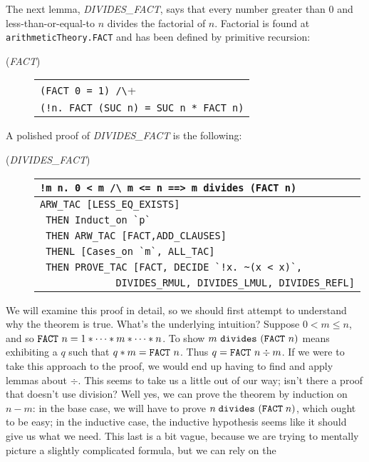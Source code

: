 The next lemma, {\small{\it DIVIDES\_FACT\/}}, says that every number
greater than $0$ and less-than-or-equal-to $n$ divides the factorial of
$n$. Factorial is found at \verb+arithmeticTheory.FACT+ and has been
defined by primitive recursion:
\begin{description}
\item [\small{({\it FACT\/})}]
\begin{tabular}[t]{l}
\verb+(FACT 0 = 1) /\+ \\
\verb+(!n. FACT (SUC n) = SUC n * FACT n)+ \\
\end{tabular}
\end{description}
A polished proof of {\small{\it DIVIDES\_FACT\/}} is the following:
\begin{description}
\item [\small{({\it DIVIDES\_FACT\/})}]
\begin{tabular}[t]{l}
\verb+!m n. 0 < m /\ m <= n ==> m divides (FACT n)+ \\ \hline
\verb+ARW_TAC [LESS_EQ_EXISTS]+ \\
\verb+ THEN Induct_on `p`+ \\
\verb+ THEN ARW_TAC [FACT,ADD_CLAUSES]+ \\
\verb+ THENL [Cases_on `m`, ALL_TAC]+ \\
\verb+ THEN PROVE_TAC [FACT, DECIDE `!x. ~(x < x)`,+ \\
\verb+             DIVIDES_RMUL, DIVIDES_LMUL, DIVIDES_REFL]+ \\
\end{tabular}
\end{description}
We will examine this proof in detail, so we should first attempt to
understand why the theorem is true. What's the underlying intuition?
Suppose $0 < m \leq n$, and so $\mbox{\tt FACT}\ n = 1 * \cdots * m *
\cdots * n$. To show $m\ \mbox{\tt divides}\ (\mbox{\tt FACT}\ n)$ means
exhibiting a $q$ such that $q * m = \mbox{\tt FACT}\ n$. Thus $q =
\mbox{\tt FACT}\ n \div m$. If we were to take this approach to the
proof, we would end up having to find and apply lemmas about
$\div$. This seems to take us a little out of our way; isn't there a
proof that doesn't use division? Well yes, we can prove the theorem by
induction on $n - m$: in the base case, we will have to prove $n\;
\mbox{\tt divides}\ (\mbox{\tt FACT}\; n)$, which ought to be easy; in
the inductive case, the inductive hypothesis seems like it should give
us what we need. This last is a bit vague, because we are trying to
mentally picture a slightly complicated formula, but we can rely on the
